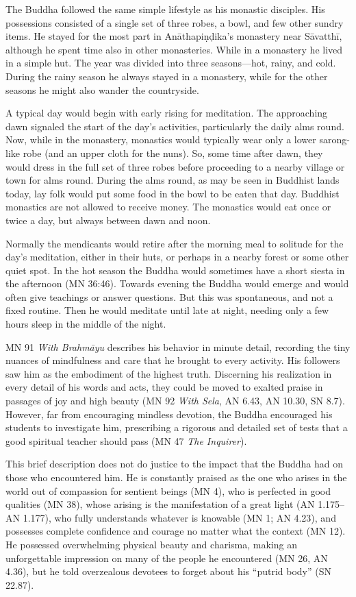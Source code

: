 \documentclass[12pt,openany]{book}%
\begin{document}
The Buddha followed the same simple lifestyle as his monastic disciples. His possessions consisted of a single set of three robes, a bowl, and few other sundry items. He stayed for the most part in \textsanskrit{Anāthapiṇḍika}’s monastery near \textsanskrit{Sāvatthī}, although he spent time also in other monasteries. While in a monastery he lived in a simple hut. The year was divided into three seasons—hot, rainy, and cold. During the rainy season he always stayed in a monastery, while for the other seasons he might also wander the countryside.

A typical day would begin with early rising for meditation. The approaching dawn signaled the start of the day’s activities, particularly the daily alms round. Now, while in the monastery, monastics would typically wear only a lower sarong-like robe (and an upper cloth for the nuns). So, some time after dawn, they would dress in the full set of three robes before proceeding to a nearby village or town for alms round. During the alms round, as may be seen in Buddhist lands today, lay folk would put some food in the bowl to be eaten that day. Buddhist monastics are not allowed to receive money. The monastics would eat once or twice a day, but always between dawn and noon.

Normally the mendicants would retire after the morning meal to solitude for the day’s meditation, either in their huts, or perhaps in a nearby forest or some other quiet spot. In the hot season the Buddha would sometimes have a short siesta in the afternoon (MN 36:46). Towards evening the Buddha would emerge and would often give teachings or answer questions. But this was spontaneous, and not a fixed routine. Then he would meditate until late at night, needing only a few hours sleep in the middle of the night.

MN 91 \textit{With \textsanskrit{Brahmāyu}} describes his behavior in minute detail, recording the tiny nuances of mindfulness and care that he brought to every activity. His followers saw him as the embodiment of the highest truth. Discerning his realization in every detail of his words and acts, they could be moved to exalted praise in passages of joy and high beauty (MN 92 \textit{With Sela}, AN 6.43, AN 10.30, SN 8.7). However, far from encouraging mindless devotion, the Buddha encouraged his students to investigate him, prescribing a rigorous and detailed set of tests that a good spiritual teacher should pass (MN 47 \textit{The Inquirer}).

This brief description does not do justice to the impact that the Buddha had on those who encountered him. He is constantly praised as the one who arises in the world out of compassion for sentient beings (MN 4), who is perfected in good qualities (MN 38), whose arising is the manifestation of a great light (AN 1.175–AN 1.177), who fully understands whatever is knowable (MN 1; AN 4.23), and possesses complete confidence and courage no matter what the context (MN 12). He possessed overwhelming physical beauty and charisma, making an unforgettable impression on many of the people he encountered (MN 26, AN 4.36), but he told overzealous devotees to forget about his “putrid body” (SN 22.87).
\end{document}
